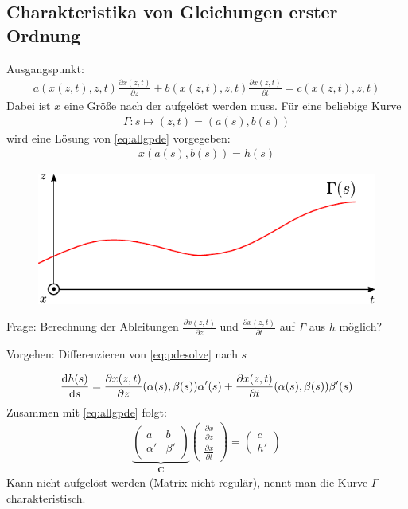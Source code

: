 \subsection{Charakteristika von Gleichungen erster Ordnung}
Ausgangspunkt:
\begin{align}
\label{eq:allgpde}
a(x(z,t),z,t)\frac{\partial x(z,t)}{\partial z}+b(x(z,t),z,t)\frac{\partial x(z,t)}{\partial t}=c(x(z,t),z,t)
\end{align}
Dabei ist $x$ eine Größe nach der aufgelöst werden muss.
Für eine beliebige Kurve
\begin{align*}
\Gamma: s \mapsto (z,t) = (a(s),b(s))
\end{align*}
wird eine Lösung von \eqref{eq:allgpde} vorgegeben:
\begin{align}
\label{eq:pdesolve}
x(a(s),b(s))=h(s)
\end{align}

\begin{figure}[ht]
	\centering
	\includegraphics{img/charakteristik}
	\label{fig:charakteristik}
\end{figure}
Frage: Berechnung der Ableitungen $\frac{\partial x(z,t)}{\partial z}$ und $\frac{\partial x(z,t)}{\partial t}$ auf $\Gamma$ aus $h$ möglich?

Vorgehen: Differenzieren von \eqref{eq:pdesolve} nach $s$

\begin{align*}
\frac{\mathrm{d} h(s)}{\mathrm{d} s} = \frac{\partial x(z,t)}{\partial z}(\alpha(s),\beta(s))\alpha'(s)+\frac{\partial x(z,t)}{\partial t}(\alpha(s),\beta(s))\beta'(s)
\end{align*}
Zusammen mit \eqref{eq:allgpde} folgt:
\begin{align}
\label{eq:matrixpde}
\underbrace { \begin{pmatrix} a & b \\ \alpha ' & \beta ' \end{pmatrix} }_{ { \bm{C}} } \begin{pmatrix} \frac { \partial x }{ \partial z }  \\ \frac { \partial x }{ \partial t }  \end{pmatrix}=\begin{pmatrix} c \\ h' \end{pmatrix}
\end{align}
Kann nicht aufgelöst werden (Matrix nicht regulär), nennt man die Kurve $\Gamma$ charakteristisch.

